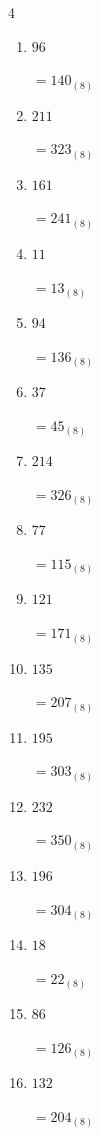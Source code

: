 \begin{multicols}{4}
\begin{enumerate}
        $=131_{(8)}$

  \item $96$

        $=140_{(8)}$

  \item $211$

        $=323_{(8)}$

  \item $161$

        $=241_{(8)}$

  \item $11$

        $=13_{(8)}$

  \item $94$

        $=136_{(8)}$

  \item $37$

        $=45_{(8)}$

  \item $214$

        $=326_{(8)}$

  \item $77$

        $=115_{(8)}$

  \item $121$

        $=171_{(8)}$

  \item $135$

        $=207_{(8)}$

  \item $195$

        $=303_{(8)}$

  \item $232$

        $=350_{(8)}$

  \item $196$

        $=304_{(8)}$

  \item $18$

        $=22_{(8)}$

\columnbreak %

  \item $86$

        $=126_{(8)}$

  \item $132$

        $=204_{(8)}$


\end{enumerate}
\end{multicols}
